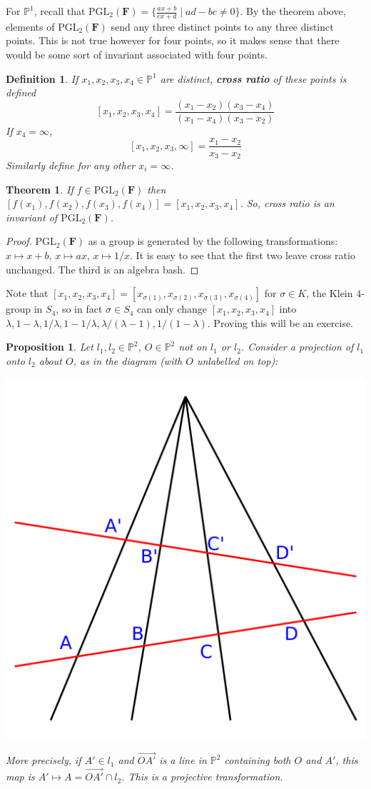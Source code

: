 \documentclass[12pt]{article}
\newcommand{\F}{\mathbf{F}}
\renewcommand{\P}{\mathbb{P}}
\renewcommand{\vec}{\overrightarrow}
\newcommand{\PGL}{\mathrm{PGL}}
\newtheorem{definition}{Definition}
\newtheorem{theorem}{Theorem}
\newtheorem{proposition}{Proposition}
\begin{document}
    For $\P^1$, recall that $\PGL_2(\F) = \{\frac{ax+b}{cx+d} \mid ad - bc \neq 0\}$. By the theorem above, elements of $\PGL_2(\F)$ send any three distinct points to any three distinct points. This is not true however for four points, so it makes sense that there would be some sort of invariant associated with four points. 
    \begin{definition}
        If $x_1, x_2, x_3, x_4 \in \P^1$ are distinct, \textbf{cross ratio} of these points is defined 
        $$[x_1, x_2, x_3, x_4] = \frac{(x_1-x_2)(x_3-x_4)}{(x_1-x_4)(x_3-x_2)}$$
        If $x_4 = \infty$, 
        $$[x_1, x_2, x_3, \infty] = \frac{x_1 - x_2}{x_3 - x_2}$$
        Similarly define for any other $x_i = \infty$. 
    \end{definition}
    \begin{theorem}
        If $f \in \PGL_2(\F)$ then $[f(x_1), f(x_2), f(x_3), f(x_4)] = [x_1, x_2, x_3, x_4]$. So, cross ratio is an invariant of $\PGL_2(\F)$.
    \end{theorem}
    \begin{proof}
        $\PGL_2(\F)$ as a group is generated by the following transformations: $x \mapsto x + b$, $x \mapsto ax$, $x \mapsto 1/x$. It is easy to see that the first two leave cross ratio unchanged. The third is an algebra bash. 
    \end{proof}
    Note that $[x_1, x_2, x_3, x_4] = [x_{\sigma(1)}, x_{\sigma(2)}, x_{\sigma(3)}, x_{\sigma(4)}]$ for $\sigma \in K$, the Klein $4$-group in $S_4$, so in fact $\sigma \in S_4$ can only change $[x_1, x_2, x_3, x_4]$ into $\lambda, 1-\lambda, 1/\lambda, 1-1/\lambda, \lambda/(\lambda-1), 1/(1-\lambda)$. Proving this will be an exercise. \par 
    \begin{proposition}
        Let $l_1, l_2 \in \P^2$, $O \in \P^2$ not on $l_1$ or $l_2$. Consider a projection of $l_1$ onto $l_2$ about $O$, as in the diagram (with $O$ unlabelled on top): 
        \begin{center}
            \includegraphics[width = 0.4\linewidth]{crossratio.png}
        \end{center}
        More precisely, if $A' \in l_1$ and $\vec{OA'}$ is a line in $\P^2$ containing both $O$ and $A'$, this map is $A' \mapsto A = \vec{OA'} \cap l_2$. This is a projective transformation. 
    \end{proposition} 
\end{document}
